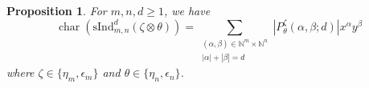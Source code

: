 \documentclass[12pt,reqno]{amsart}
\newtheorem{proposition}[theorem]{Proposition}
\theoremstyle{definition}
\newtheorem{definition}[theorem]{Definition}
\theoremstyle{remark}
\newcommand{\ind}{\mathrm{sInd}_{m,n}^{d}}
\DeclareMathOperator{\ch}{char}
\DeclareMathOperator{\Hom}{Hom}
\begin{document}

\begin{proposition}\label{trivial}
    For $m,n,d\geq 1$, we have
    $$\ch(\ind (\zeta\otimes\theta))=\sum_{\substack{(\alpha,\beta)\in\mathbb{N}^{m}\times\mathbb{N}^{n}\\|\alpha|+|\beta|=d}}|P^{\zeta}_{\theta}(\alpha,\beta;d)|x^{\alpha}y^{\beta}$$
    where $\zeta\in\{\eta_{m},\epsilon_{m}\}$ and $\theta\in\{\eta_{n},\epsilon_{n}\}$.
\end{proposition}
\end{document}
